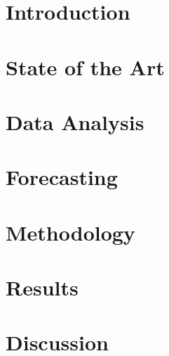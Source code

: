 \documentclass[a4paper,11pt,twoside]{memoir}
\begin{document}
\chapter{Introduction}
\label{ch:intro}



\chapter{State of the Art}
\label{ch:state_of_the_art}



\chapter{Data Analysis}
\label{ch:data_analysis}



\chapter{Forecasting}
\label{ch:forecasting}



\chapter{Methodology}
\label{ch:methodology}



\chapter{Results}
\label{ch:results}



\chapter{Discussion}
\label{ch:discussion}
\end{document}

